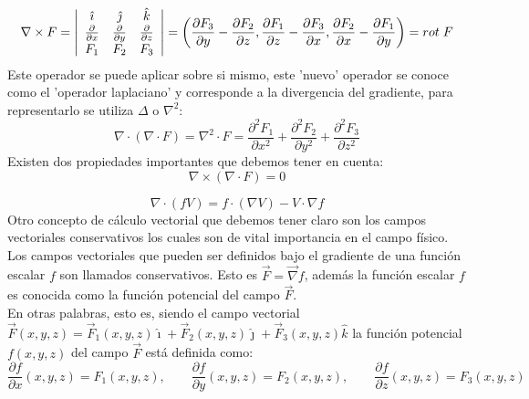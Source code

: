 $$\nabla \times F = \left| {\begin{array}{ccc}
   \hat{\imath} & \hat{\jmath} & \hat{k} \\
   \frac{\partial}{\partial x} & \frac{\partial}{\partial y} & \frac{\partial}{\partial z} \\
   F_1 & F_2 & F_3 \\
  \end{array} } \right|
  =\left(\frac{\partial F_3}{\partial y}-\frac{\partial F_2}{\partial z},\frac{\partial F_1}{\partial z}-\frac{\partial F_3}{\partial x},\frac{\partial F_2}{\partial x}-\frac{\partial F_1}{\partial y}\right) = \mathnormal{rot}\;F$$
Este operador se puede aplicar sobre si mismo, este 'nuevo' operador se conoce como el 'operador laplaciano' y corresponde a la divergencia del gradiente, para representarlo se utiliza $\Delta$ o $\nabla^2$:
$$\nabla \cdot (\nabla \cdot F) =\nabla^2 \cdot F =\frac{\partial^2 F_1}{\partial x^2}+\frac{\partial^2 F_2}{\partial y^2}+\frac{\partial^2 F_3}{\partial z^2}$$
Existen dos propiedades importantes que debemos tener en cuenta:
\begin{equation}
\label{eq:Rotor de una divergencia}
\nabla \times (\nabla \cdot F)=0
\end{equation}

\begin{equation}
\label{eq:Identidad gradiente}
\nabla \cdot (fV)=f\cdot (\nabla V)-V\cdot\nabla f
\end{equation}
Otro concepto de cálculo vectorial que debemos tener claro son los campos vectoriales conservativos los cuales son de vital importancia en el campo físico. 
Los campos vectoriales que pueden ser definidos bajo el gradiente de una función escalar $f$ son llamados conservativos. Esto es $\vec{F}=\vec{\nabla} f$, además la función escalar $f$ es conocida como la función potencial del campo $\vec{F}$.\\
En otras palabras, esto es, siendo el campo vectorial $\vec{F}(x,y,z)=\vec{F}_1(x,y,z)\hat{\imath}+\vec{F}_2(x,y,z)\hat{\jmath}+\vec{F}_3(x,y,z)\hat{k}$ la función potencial $f(x,y,z)$ del campo $\vec{F}$ está definida como:
$$\frac{\partial f}{\partial x}(x,y,z)=F_1(x,y,z),\qquad \frac{\partial f}{\partial y}(x,y,z)=F_2(x,y,z),\qquad \frac{\partial f}{\partial z}(x,y,z)=F_3(x,y,z)$$
